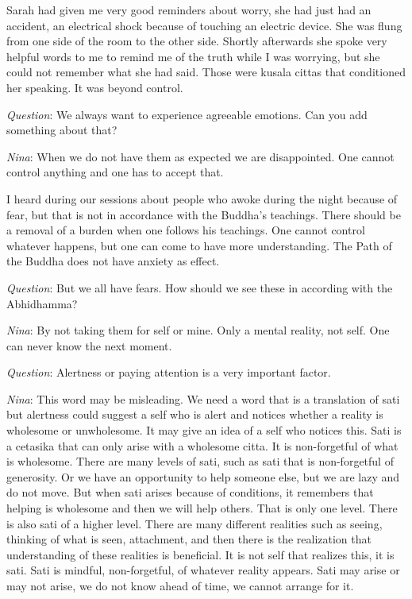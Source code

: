 Sarah had given me very good reminders about worry, she had just had an accident, an electrical shock because of touching an electric device. She was flung from one side of the room to the other side. Shortly afterwards she spoke very helpful words to me to remind me of the truth while I was worrying, but she could not remember what she had said. Those were kusala cittas that conditioned her speaking. It was beyond control.


\textit{Question}: We always want to experience agreeable emotions. Can you add something about that?

\textit{Nina}: When we do not have them as expected we are disappointed. One cannot control anything and one has to accept that. 

I heard during our sessions about people who awoke during the night because of fear, but that is not in accordance with the Buddha’s teachings. There should be a removal of a burden when one follows his teachings. One cannot control whatever happens, but one can come to have more understanding. The Path of the Buddha does not have anxiety as effect. 


\textit{Question}: But we all have fears. How should we see these in according with the Abhidhamma?



\textit{Nina}: By not taking them for self or mine. Only a mental reality, not self. One can never know the next moment. 


\textit{Question}: Alertness or paying attention is a very important factor.



\textit{Nina}: This word may be misleading. We need a word that is a translation of sati but alertness could suggest a self who is alert and notices whether a reality is wholesome or unwholesome. It may give an idea of a self who notices this. Sati is a cetasika that can only arise with a wholesome citta. It is non-forgetful of what is wholesome. There are many levels of sati, such as sati that is non-forgetful of generosity. Or we have an opportunity to help someone else, but we are lazy and do not move. But when sati arises because of conditions, it remembers that helping is wholesome and then we will help others. That is only one level. There is also sati of a higher level. There are many different realities such as seeing, thinking of what is seen, attachment, and then there is the realization that understanding of these realities is beneficial. It is not self that realizes this, it is sati. Sati is mindful, non-forgetful, of whatever reality appears. Sati may arise or may not arise, we do not know ahead of time, we cannot arrange for it. 


